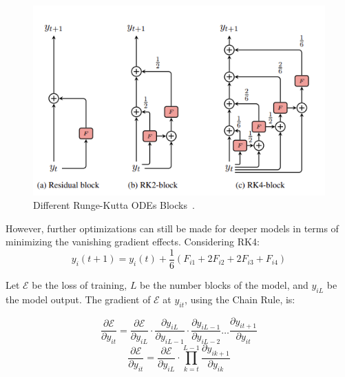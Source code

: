 \documentclass[12pt,a4paper]{report}
\begin{document}
\begin{figure}[th]
  \centering
  \includegraphics[scale=1]{./pics/odes.png}
  \caption[Different Runge-Kutta ODEs Blocks]{Different Runge-Kutta ODEs Blocks~\cite{li2022ode}.}
  \label{fig:p9}
\end{figure}

However, further optimizations can still be made for deeper models in terms of minimizing the vanishing gradient effects. Considering RK4:
\begin{equation}
  y_i(t + 1) = y_i(t) + \frac{1}{6}(F_{i1} + 2F_{i2} + 2F_{i3} + F_{i4})\label{eq:3}
\end{equation}

Let $\mathcal{E}$ be the loss of training, $L$ be the number blocks of the model, and $y_{iL}$ be the model output. The gradient of $\mathcal{E}$ at $y_{it}$, using the Chain Rule, is:

\begin{equation}
  \frac{\partial \mathcal{E}}{\partial y_{it}} = \frac{\partial \mathcal{E}}{\partial y_{iL}} \cdot \frac{\partial y_{iL}}{\partial y_{iL-1}} \cdot \frac{\partial y_{iL-1}}{\partial y_{iL-2}} \dots \frac{\partial y_{it+1}}{\partial y_{it}}
\end{equation}
\begin{equation}\label{eq:4}
  \frac{\partial \mathcal{E}}{\partial y_{it}} = \frac{\partial \mathcal{E}}{\partial y_{iL}} \cdot \prod_{k=t}^{L-1} \frac{\partial y_{ik+1}}{\partial y_{ik}}
\end{equation}
\end{document}
